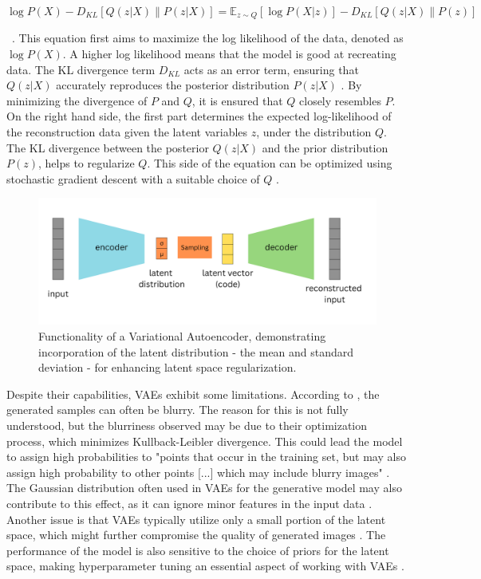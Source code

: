 \[
\log P(X) - D_{KL} \left[ Q(z|X) \parallel P(z|X) \right] = \mathbb{E}_{z \sim Q} \left[ \log P(X|z) \right] - D_{KL} \left[ Q(z|X) \parallel P(z) \right]
\]

~\citep{doerschVAE}.
This equation first aims to maximize the log likelihood of the data, denoted as \(\log P(X)\). A higher log likelihood means that the model is good at recreating data. The KL divergence term \(D_{KL} \) acts as an error term, ensuring that \(Q(z|X)\) accurately reproduces the posterior distribution \(P(z|X)\) \citep{doerschVAE}. By minimizing the divergence of \(P\) and \(Q\), it is ensured that \(Q\) closely resembles \(P\). On the right hand side, the first part determines the expected log-likelihood of the reconstruction data given the latent variables \(z\), under the distribution \(Q\). The KL divergence between the posterior \(Q(z|X)\) and the prior distribution \(P(z)\), helps to regularize \(Q\). This side of the equation can be optimized using stochastic gradient descent with a suitable choice of \(Q\) \citep{doerschVAE}. 

\begin{figure}[ht]
    \centering
      \hspace{.8cm}
      \includegraphics[width=.9\columnwidth]{figures/VAE.png}
      \caption{Functionality of a Variational Autoencoder, demonstrating incorporation of the latent distribution - the mean and standard deviation - for enhancing latent space regularization.}
      \label{fig:figureVAE}
\end{figure}

Despite their capabilities, VAEs exhibit some limitations. According to \citeauthor{GoodfellowDeepLearning}, the generated samples can often be blurry. The reason for this is not fully 
understood, but the blurriness observed may be due to their optimization process, which minimizes Kullback-Leibler divergence. This could lead the model to assign high probabilities to "points that occur in the training set, but may also assign high probability to other points [...] which may include blurry images" \citep{GoodfellowDeepLearning}. The Gaussian distribution often used in VAEs for the generative model may also contribute to this effect, as it can ignore minor features in the input data \citep{GoodfellowDeepLearning}. Another issue is that VAEs typically utilize only a small portion of the latent space, which might further compromise the quality of generated images \citep{GoodfellowDeepLearning}. The performance of the model is also sensitive to the choice of priors for the latent space, making hyperparameter tuning an essential aspect of working with VAEs \citep{kingmaVAE, higginsVAE}. 

